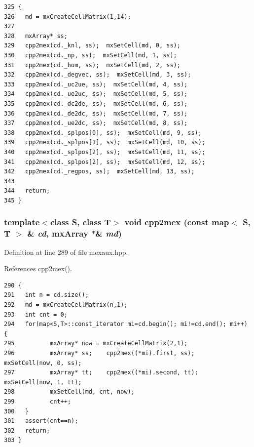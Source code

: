 \footnotesize\begin{verbatim}325 {
326   md = mxCreateCellMatrix(1,14);
327   
328   mxArray* ss;
329   cpp2mex(cd._knl, ss);  mxSetCell(md, 0, ss);
330   cpp2mex(cd._np, ss);  mxSetCell(md, 1, ss);
331   cpp2mex(cd._hom, ss);  mxSetCell(md, 2, ss);
332   cpp2mex(cd._degvec, ss);  mxSetCell(md, 3, ss);
333   cpp2mex(cd._uc2ue, ss);  mxSetCell(md, 4, ss);
334   cpp2mex(cd._ue2uc, ss);  mxSetCell(md, 5, ss);
335   cpp2mex(cd._dc2de, ss);  mxSetCell(md, 6, ss);
336   cpp2mex(cd._de2dc, ss);  mxSetCell(md, 7, ss);
337   cpp2mex(cd._ue2dc, ss);  mxSetCell(md, 8, ss);
338   cpp2mex(cd._splpos[0], ss);  mxSetCell(md, 9, ss);
339   cpp2mex(cd._splpos[1], ss);  mxSetCell(md, 10, ss);
340   cpp2mex(cd._splpos[2], ss);  mxSetCell(md, 11, ss);
341   cpp2mex(cd._splpos[2], ss);  mxSetCell(md, 12, ss);
342   cpp2mex(cd._regpos, ss);  mxSetCell(md, 13, ss);
343   
344   return;
345 }
\end{verbatim}\normalsize 


\subsubsection{\setlength{\rightskip}{0pt plus 5cm}template$<$class S, class T$>$ void cpp2mex (const map$<$ S, T $>$ \& {\em cd}, mx\-Array $\ast$\& {\em md})\hspace{0.3cm}{\tt  [inline]}}\label{mexaux_8hpp_68c396b62797dc97c175d7f137797c94_68c396b62797dc97c175d7f137797c94}




Definition at line 289 of file mexaux.hpp.

References cpp2mex().

\footnotesize\begin{verbatim}290 {
291   int n = cd.size();
292   md = mxCreateCellMatrix(n,1);
293   int cnt = 0;
294   for(map<S,T>::const_iterator mi=cd.begin(); mi!=cd.end(); mi++) {
295          mxArray* now = mxCreateCellMatrix(2,1);
296          mxArray* ss;    cpp2mex((*mi).first, ss);       mxSetCell(now, 0, ss);
297          mxArray* tt;    cpp2mex((*mi).second, tt);      mxSetCell(now, 1, tt);
298          mxSetCell(md, cnt, now);
299          cnt++;
300   }
301   assert(cnt==n);
302   return;
303 }
\end{verbatim}\normalsize 


